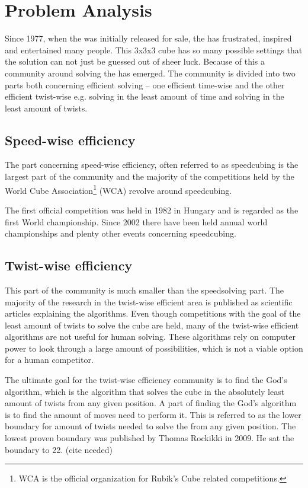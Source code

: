 \chapter{Problem Analysis}
Since 1977, when the \rubik{} was initially released for sale, the \rubik{} has frustrated, inspired and entertained many people. This 3x3x3 cube has so many possible settings that the solution can not just be guessed out of sheer luck. Because of this a community around solving the \rubik{} has emerged. The community is divided into two parts both concerning efficient solving -- one efficient time-wise and the other efficient twist-wise e.g. solving in the least amount of time and solving in the least amount of twists. 

\section{Speed-wise efficiency}
The part concerning speed-wise efficiency, often referred to as speedcubing is the largest part of the community and the majority of the competitions held by the World Cube Association\footnote{WCA is the official organization for Rubik's Cube related competitions.} (WCA)\cite{wca} revolve around speedcubing.

The first official competition was held in 1982 in Hungary and is regarded as the first World championship. Since 2002 there have been held annual world championships and plenty other events concerning speedcubing. 


\section{Twist-wise efficiency}
This part of the community is much smaller than the speedsolving part. The majority of the research in the twist-wise efficient area is published as scientific articles explaining the algorithms. Even though competitions with the goal of the least amount of twists to solve the cube are held, many of the twist-wise efficient algorithms are not useful for human solving. These algorithms rely on computer power to look through a large amount of possibilities, which is not a viable option for a human competitor. 

The ultimate goal for the twist-wise efficiency community is to find the God's algorithm, which is the algorithm that solves the cube in the absolutely least amount of twists from any given position. A part of finding the God's algorithm is to find the amount of moves need to perform it. This is referred to as the lower boundary for amount of twists needed to solve the \rubik{} from any given position. The lowest proven boundary was published by Thomas Rockikki in 2009. He sat the boundary to 22. (cite needed)

